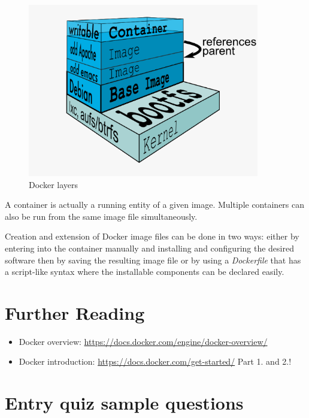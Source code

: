 \documentclass[a4paper]{article}
\begin{document}
\begin{figure}[H]
    \centering
    \includegraphics[width=0.9\textwidth]{figures/docker_layers.png}
    \caption{Docker layers}
    \label{fig:layers}
\end{figure}

A container is actually a running entity of a given image. Multiple containers can also be run from the same image file
simultaneously.

Creation and extension of Docker image files can be done in two ways: either by entering into the container manually
and installing and configuring the desired software then by saving the resulting image file or by using a
\emph{Dockerfile} that has a script-like syntax where the
installable components can be declared easily.

\section{Further Reading}

\begin{itemize}
    \item Docker overview: \url{https://docs.docker.com/engine/docker-overview/}
    \item Docker introduction: \url{https://docs.docker.com/get-started/} Part 1. and 2.!
\end{itemize}

\appendix

\section{Entry quiz sample questions}
\end{document}
